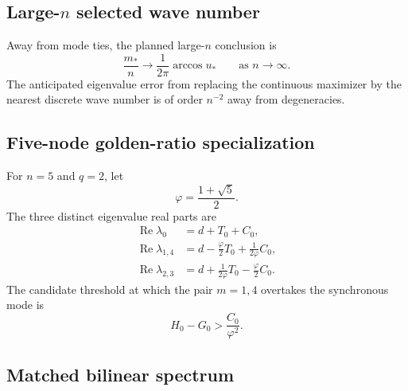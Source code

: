 \documentclass[11pt, reqno]{amsart}
\theoremstyle{definition}
\theoremstyle{remark}
\newcommand{\Ree}{\operatorname{Re}}
\begin{document}

\subsection{Large-$n$ selected wave number}

Away from mode ties, the planned large-$n$ conclusion is
\begin{equation}
\label{eq:large-n-mode}
    \frac{m_*}{n}
    \longrightarrow
    \frac{1}{2\pi}\arccos u_*
    \qquad\text{as }n\to\infty.
\end{equation}
The anticipated eigenvalue error from replacing the continuous maximizer by the
nearest discrete wave number is of order $n^{-2}$ away from degeneracies.


\subsection{Five-node golden-ratio specialization}

For $n=5$ and $q=2$, let
\[
    \varphi=\frac{1+\sqrt5}{2}.
\]
The three distinct eigenvalue real parts are
\begin{align}
\label{eq:five-real-0}
    \Ree\lambda_0
    &=d+T_0+C_0,\\
\label{eq:five-real-1}
    \Ree\lambda_{1,4}
    &=d-\frac{\varphi}{2}T_0+\frac{1}{2\varphi}C_0,\\
\label{eq:five-real-2}
    \Ree\lambda_{2,3}
    &=d+\frac{1}{2\varphi}T_0-\frac{\varphi}{2}C_0.
\end{align}
The candidate threshold at which the pair $m=1,4$ overtakes the synchronous
mode is
\begin{equation}
\label{eq:five-threshold}
    H_0-G_0>\frac{C_0}{\varphi^2}.
\end{equation}


\subsection{Matched bilinear spectrum}
\end{document}
